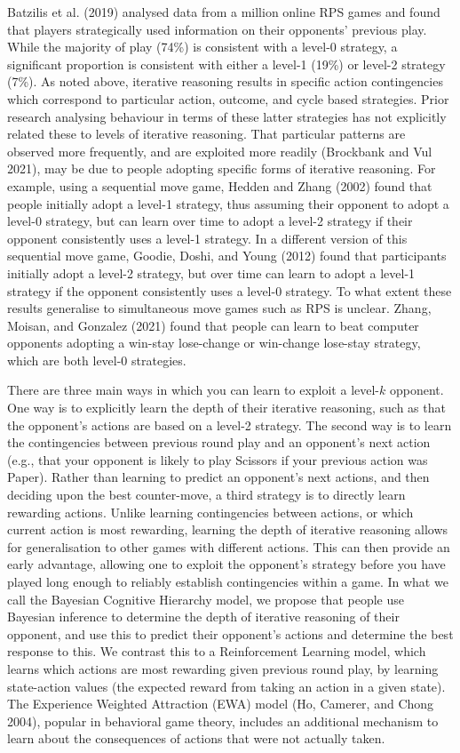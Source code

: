 \documentclass[smallextended]{svjour3}       %
\begin{document}
Batzilis et al. (2019) analysed data from a million online RPS games and
found that players strategically used information on their opponents'
previous play. While the majority of play (74\%) is consistent with a
level-0 strategy, a significant proportion is consistent with either a
level-1 (19\%) or level-2 strategy (7\%). As noted above, iterative
reasoning results in specific action contingencies which correspond to
particular action, outcome, and cycle based strategies. Prior research
analysing behaviour in terms of these latter strategies has not
explicitly related these to levels of iterative reasoning. That
particular patterns are observed more frequently, and are exploited more
readily (Brockbank and Vul 2021), may be due to people adopting specific
forms of iterative reasoning. For example, using a sequential move game,
Hedden and Zhang (2002) found that people initially adopt a level-1
strategy, thus assuming their opponent to adopt a level-0 strategy, but
can learn over time to adopt a level-2 strategy if their opponent
consistently uses a level-1 strategy. In a different version of this
sequential move game, Goodie, Doshi, and Young (2012) found that
participants initially adopt a level-2 strategy, but over time can learn
to adopt a level-1 strategy if the opponent consistently uses a level-0
strategy. To what extent these results generalise to simultaneous move
games such as RPS is unclear. Zhang, Moisan, and Gonzalez (2021) found
that people can learn to beat computer opponents adopting a win-stay
lose-change or win-change lose-stay strategy, which are both level-0
strategies.

There are three main ways in which you can learn to exploit a
level-\(k\) opponent. One way is to explicitly learn the depth of their
iterative reasoning, such as that the opponent's actions are based on a
level-2 strategy. The second way is to learn the contingencies between
previous round play and an opponent's next action (e.g., that your
opponent is likely to play Scissors if your previous action was Paper).
Rather than learning to predict an opponent's next actions, and then
deciding upon the best counter-move, a third strategy is to directly
learn rewarding actions. Unlike learning contingencies between actions,
or which current action is most rewarding, learning the depth of
iterative reasoning allows for generalisation to other games with
different actions. This can then provide an early advantage, allowing
one to exploit the opponent's strategy before you have played long
enough to reliably establish contingencies within a game. In what we
call the Bayesian Cognitive Hierarchy model, we propose that people use
Bayesian inference to determine the depth of iterative reasoning of
their opponent, and use this to predict their opponent's actions and
determine the best response to this. We contrast this to a Reinforcement
Learning model, which learns which actions are most rewarding given
previous round play, by learning state-action values (the expected
reward from taking an action in a given state). The Experience Weighted
Attraction (EWA) model (Ho, Camerer, and Chong 2004), popular in
behavioral game theory, includes an additional mechanism to learn about
the consequences of actions that were not actually taken.
\end{document}
